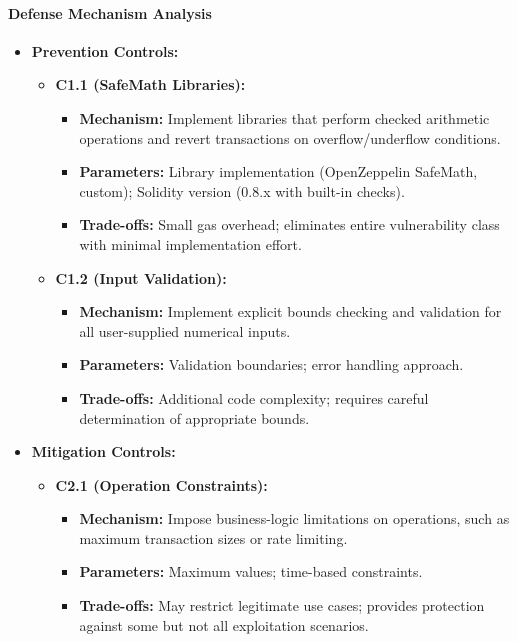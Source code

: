 \paragraph{Defense Mechanism Analysis}

\begin{itemize}
\item \textbf{Prevention Controls:}
    \begin{itemize}
    \item \textbf{C1.1 (SafeMath Libraries):}
        \begin{itemize}
        \item \textbf{Mechanism:} Implement libraries that perform checked arithmetic operations and revert transactions on overflow/underflow conditions.
        \item \textbf{Parameters:} Library implementation (OpenZeppelin SafeMath, custom); Solidity version (0.8.x with built-in checks).
        \item \textbf{Trade-offs:} Small gas overhead; eliminates entire vulnerability class with minimal implementation effort\cite{chen2020state}.
        \end{itemize}
    
    \item \textbf{C1.2 (Input Validation):}
        \begin{itemize}
        \item \textbf{Mechanism:} Implement explicit bounds checking and validation for all user-supplied numerical inputs.
        \item \textbf{Parameters:} Validation boundaries; error handling approach.
        \item \textbf{Trade-offs:} Additional code complexity; requires careful determination of appropriate bounds.
        \end{itemize}
    \end{itemize}

\item \textbf{Mitigation Controls:}
    \begin{itemize}
    \item \textbf{C2.1 (Operation Constraints):}
        \begin{itemize}
        \item \textbf{Mechanism:} Impose business-logic limitations on operations, such as maximum transaction sizes or rate limiting.
        \item \textbf{Parameters:} Maximum values; time-based constraints.
        \item \textbf{Trade-offs:} May restrict legitimate use cases; provides protection against some but not all exploitation scenarios.
        \end{itemize}
    

\end{itemize}
\end{itemize}
